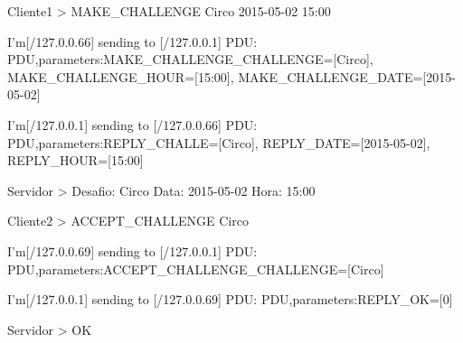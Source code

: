 \documentclass[runningheads,a4paper]{llncs}
\begin{document}
Cliente1 > MAKE_CHALLENGE Circo 2015-05-02 15:00

I'm[/127.0.0.66] sending to [/127.0.0.1] PDU: PDU,parameters:{MAKE_CHALLENGE_CHALLENGE=[Circo], MAKE_CHALLENGE_HOUR=[15:00], MAKE_CHALLENGE_DATE=[2015-05-02]}

I'm[/127.0.0.1] sending to [/127.0.0.66] PDU: PDU,parameters:{REPLY_CHALLE=[Circo], REPLY_DATE=[2015-05-02], REPLY_HOUR=[15:00]}

Servidor >  Desafio: Circo Data: 2015-05-02 Hora: 15:00

Cliente2 > ACCEPT_CHALLENGE Circo

I'm[/127.0.0.69] sending to [/127.0.0.1] PDU: PDU,parameters:{ACCEPT_CHALLENGE_CHALLENGE=[Circo]}

I'm[/127.0.0.1] sending to [/127.0.0.69] PDU: PDU,parameters:{REPLY_OK=[0]}

Servidor > OK
\end{document}
